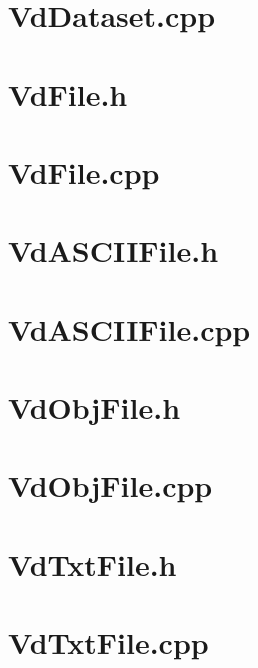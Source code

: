\documentclass[a4paper,12pt,bibliography=totoc, listof=totoc,titlepage,pointlessnumbers]{scrreprt}
\begin{document}
\begin{appendices}
\section{VdDataset.cpp}
\label{a:VdDataset.cpp}



\section{VdFile.h}
\label{a:VdFile.h}


\section{VdFile.cpp}
\label{a:VdFile.cpp}


\section{VdASCIIFile.h}
\label{a:VdASCIIFile.h}


\section{VdASCIIFile.cpp}
\label{a:VdASCIIFile.cpp}


\section{VdObjFile.h}
\label{a:VdObjFile.h}


\section{VdObjFile.cpp}
\label{a:VdObjFile.cpp}


\section{VdTxtFile.h}
\label{a:VdTxtFile.h}


\section{VdTxtFile.cpp}
\label{a:VdTxtFile.cpp}



\end{appendices}
\end{document}
